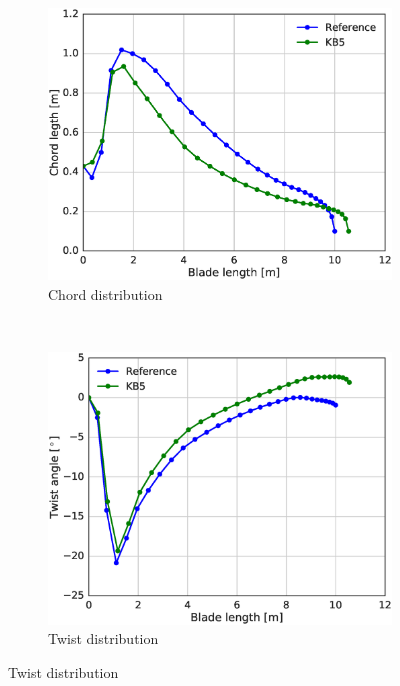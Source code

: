 \begin{figure}[tph]
\begin{subfigure}{0.50\textwidth}
\includegraphics[width=\linewidth]{figures/KB6_final/KB5_chord.eps}
\caption{Chord distribution}
\label{subfig:KB5_chord}
\end{subfigure}
 ~
\begin{subfigure}{0.50\textwidth}
\includegraphics[width=\linewidth]{figures/KB6_final/KB5_twist.eps}
\caption{Twist distribution}
\label{subfig:KB5_twist}
\end{subfigure}


\end{figure}
